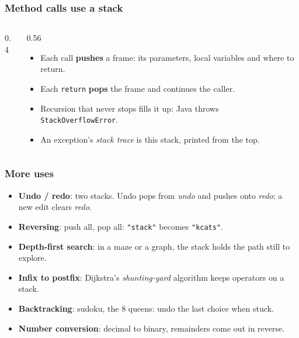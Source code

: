 \documentclass[aspectratio=169,10pt,compress]{beamer}
\begin{document}
\begin{frame}[t,fragile] \frametitle{Method calls use a stack}
  \begin{columns}[T]
    \begin{column}{0.4\textwidth}
      \begin{center}
      \end{center}
    \end{column}
    \begin{column}{0.56\textwidth}
      \begin{itemize}\small
        \item Each call \textbf{pushes} a frame: its parameters, local variables and where to return.
        \item Each \texttt{return} \textbf{pops} the frame and continues the caller.
        \item Recursion that never stops fills it up: Java throws \texttt{StackOverflowError}.
        \item An exception's \emph{stack trace} is this stack, printed from the top.
      \end{itemize}
    \end{column}
  \end{columns}
\end{frame}




\begin{frame}[t,fragile] \frametitle{More uses}
  \begin{itemize}
    \item \textbf{Undo / redo}: two stacks. Undo pops from \emph{undo} and pushes onto \emph{redo}; a new edit clears \emph{redo}.
    \item \textbf{Reversing}: push all, pop all: \texttt{"stack"} becomes \texttt{"kcats"}.
    \item \textbf{Depth-first search}: in a maze or a graph, the stack holds the path still to explore.
    \item \textbf{Infix to postfix}: Dijkstra's \emph{shunting-yard} algorithm keeps operators on a stack.
    \item \textbf{Backtracking}: sudoku, the 8 queens: undo the last choice when stuck.
    \item \textbf{Number conversion}: decimal to binary, remainders come out in reverse.
  \end{itemize}
\end{frame}
\end{document}
